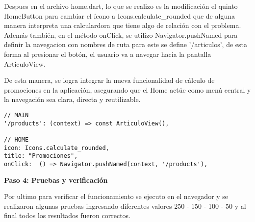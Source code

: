 Despues en el archivo home.dart, lo que se realizo es la modificación el quinto HomeButton para cambiar el ícono a Icons.calculate\_rounded que de alguna manera interpreta una calculardora que tiene algo de relación con el problema. Además también, en el método onClick, se utilizo Navigator.pushNamed para definir la navegacion con nombres de ruta para este se define '/articulos', de esta forma al presionar el botón, el usuario va a navegar hacia la pantalla ArticuloView.

De esta manera, se logra integrar la nueva funcionalidad de cálculo de promociones en la aplicación, asegurando que el Home actúe como menú central y la navegación sea clara, directa y reutilizable.


\begin{center}
\begin{lstlisting}
// MAIN
'/products': (context) => const ArticuloView(),

// HOME  
icon: Icons.calculate_rounded,
title: "Promociones",
onClick:  () => Navigator.pushNamed(context, '/products'),
\end{lstlisting}
\end{center}

\textbf{Paso 4: Pruebas y verificación}

Por ultimo para verificar el funcionamiento se ejecuto en el navegador y se realizaron algunas pruebas ingresando diferentes valores 250 - 150 - 100 - 50 y al final todos los resultados fueron correctos.
